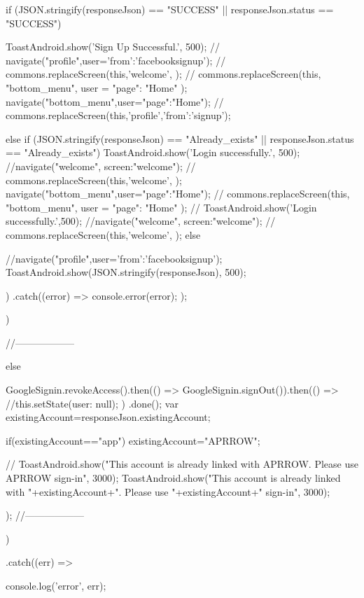 {{{{{{{{{{{                if (JSON.stringify(responseJson) == "SUCCESS" || responseJson.status == "SUCCESS") {
                  ToastAndroid.show('Sign Up Successful.', 500);
                  // navigate("profile",user={'from':'facebooksignup'}); 
                  // commons.replaceScreen(this,'welcome', {});  
     //             commons.replaceScreen(this, "bottom_menu", user = { "page": "Home" });
                   navigate("bottom_menu",user={"page":"Home"});    
                  // commons.replaceScreen(this,'profile',{'from':'signup'});

                }
                else if (JSON.stringify(responseJson) == "Already_exists" || responseJson.status == "Already_exists") {
                  ToastAndroid.show('Login successfully.', 500);
                  //navigate("welcome",{ screen:"welcome"});  
                  // commons.replaceScreen(this,'welcome', {});  
                  navigate("bottom_menu",user={"page":"Home"});
    //              commons.replaceScreen(this, "bottom_menu", user = { "page": "Home" });
                  // ToastAndroid.show('Login successfully.',500);                                                 
                  //navigate("welcome",{ screen:"welcome"});  
                  // commons.replaceScreen(this,'welcome', {});                          
                }
                else {

                  //navigate("profile",user={'from':'facebooksignup'});                    
                  ToastAndroid.show(JSON.stringify(responseJson), 500);
                }
              })
              .catch((error) => {
                console.error(error);
              });
          }
        })

      
    //------------------
      }
      else
      {
        
        GoogleSignin.revokeAccess().then(() => GoogleSignin.signOut()).then(() => {
          //this.setState({user: null});
          })
          .done();
          var existingAccount=responseJson.existingAccount;

          if(existingAccount=="app")
            existingAccount="APRROW";

       // ToastAndroid.show("This account is already linked with APRROW. Please use APRROW sign-in", 3000);
        ToastAndroid.show("This account is already linked with "+existingAccount+". Please use "+existingAccount+" sign-in", 3000);
      }
      });
    //------------------
      })


      .catch((err) => {
        console.log('error', err);

}}}}}}
